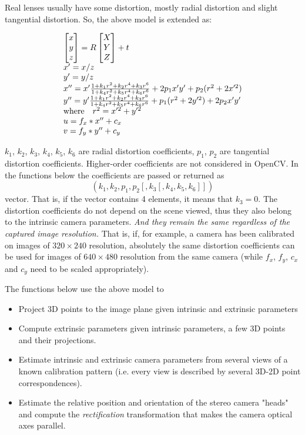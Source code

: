 Real lenses usually have some distortion, mostly
radial distortion and slight tangential distortion. So, the above model
is extended as:

\[
\begin{array}{l}
\begin{bmatrix} x\\ y\\ z \end{bmatrix} = R \begin{bmatrix} X\\ Y\\ Z \end{bmatrix} + t\\
x' = x/z\\
y' = y/z\\
x'' = x' \frac{1 + k_1 r^2 + k_2 r^4 + k_3 r^6}{1 + k_4 r^2 + k_5 r^4 + k_6 r^6} + 2 p_1 x' y' + p_2(r^2 + 2 x'^2) \\
y'' = y' \frac{1 + k_1 r^2 + k_2 r^4 + k_3 r^6}{1 + k_4 r^2 + k_5 r^4 + k_6 r^6} + p_1 (r^2 + 2 y'^2) + 2 p_2 x' y' \\
\text{where} \quad r^2 = x'^2 + y'^2 \\
u = f_x*x'' + c_x\\
v = f_y*y'' + c_y
\end{array}
\]

$k_1$, $k_2$, $k_3$, $k_4$, $k_5$, $k_6$ are radial distortion coefficients, $p_1$, $p_2$ are tangential distortion coefficients.
Higher-order coefficients are not considered in OpenCV. In the functions below the coefficients are passed or returned as
\[ (k_1, k_2, p_1, p_2[, k_3[, k_4, k_5, k_6]]) \] vector. That is, if the vector contains 4 elements, it means that $k_3=0$.
The distortion coefficients do not depend on the scene viewed, thus they also belong to the intrinsic camera parameters.
\emph{And they remain the same regardless of the captured image resolution.}
That is, if, for example, a camera has been calibrated on images of $320
\times 240$ resolution, absolutely the same distortion coefficients can
be used for images of $640 \times 480$ resolution from the same camera (while $f_x$,
$f_y$, $c_x$ and $c_y$ need to be scaled appropriately).

The functions below use the above model to

\begin{itemize}
 \item Project 3D points to the image plane given intrinsic and extrinsic parameters
 \item Compute extrinsic parameters given intrinsic parameters, a few 3D points and their projections.
 \item Estimate intrinsic and extrinsic camera parameters from several views of a known calibration pattern (i.e. every view is described by several 3D-2D point correspondences).
 \item Estimate the relative position and orientation of the stereo camera "heads" and compute the \emph{rectification} transformation that makes the camera optical axes parallel.
\end{itemize}

